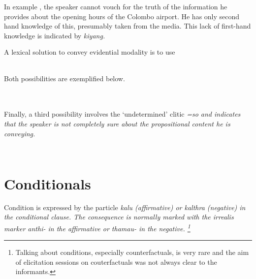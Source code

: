 In example , the speaker cannot vouch for the truth of the information he provides about the opening hours of the Colombo airport. He has only second hand knowledge of this, presumably taken from the media. This lack of first-hand knowledge is indicated by \em kiyang\em.

A lexical solution to convey evidential modality is to use 


 \\

Both possibilities are exemplified below.


 \\

 \\
Finally, a third possibility involves the `undetermined' clitic \em =so \em and indicates that the speaker is not completely sure about the propositional content he is conveying.

 \\



\section{Conditionals}\label{sec:func:Conditionals}
Condition is expressed by the particle \em kalu \em {} (affirmative) or \em kalthra \em (negative) in the conditional clause. The consequence is normally marked with the irrealis marker \em anthi- \em in the affirmative or \em thamau- \em in the negative. \footnote{Talking about conditions, especially counterfactuals, is very rare and the aim of elicitation sessions on couterfactuals was not always clear to the informants.}


